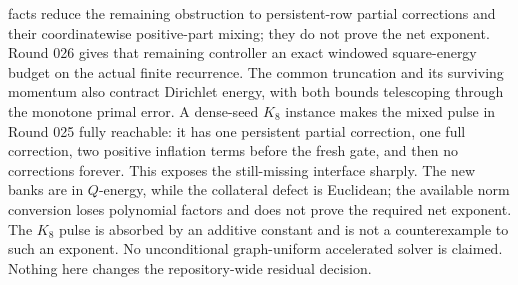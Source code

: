 facts reduce the remaining obstruction to persistent-row partial
corrections and their coordinatewise positive-part mixing; they do not prove
the net exponent.  Round 026 gives that remaining controller an exact
windowed square-energy budget on the actual finite recurrence.  The common
truncation and its surviving momentum also contract Dirichlet energy, with
both bounds telescoping through the monotone primal error.  A dense-seed
$K_8$ instance makes the mixed pulse in Round 025 fully reachable: it has one
persistent partial correction, one full correction, two positive inflation
terms before the fresh gate, and then no corrections forever.  This exposes
the still-missing interface sharply.  The new banks are in $Q$-energy, while
the collateral defect is Euclidean; the available norm conversion loses
polynomial factors and does not prove the required net exponent.  The
$K_8$ pulse is absorbed by an additive constant and is not a counterexample
to such an exponent.  No unconditional
graph-uniform accelerated solver is claimed.
Nothing here changes the repository-wide residual decision.
